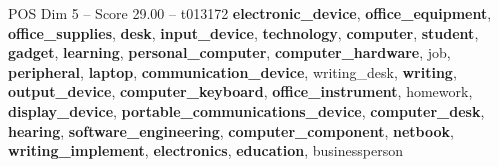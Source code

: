 \begin{textsample}{POS Dim 5 – Score 29.00 – t013172}  \label{ex:f5_pos_023}
\textbf{electronic\_device}, \textbf{office\_equipment}, \textbf{office\_supplies}, \textbf{desk}, \textbf{input\_device}, \textbf{technology}, \textbf{computer}, \textbf{student}, \textbf{gadget}, \textbf{learning}, \textbf{personal\_computer}, \textbf{computer\_hardware}, job, \textbf{peripheral}, \textbf{laptop}, \textbf{communication\_device}, writing\_desk, \textbf{writing}, \textbf{output\_device}, \textbf{computer\_keyboard}, \textbf{office\_instrument}, homework, \textbf{display\_device}, \textbf{portable\_communications\_device}, \textbf{computer\_desk}, \textbf{hearing}, \textbf{software\_engineering}, \textbf{computer\_component}, \textbf{netbook}, \textbf{writing\_implement}, \textbf{electronics}, \textbf{education}, businessperson

\end{textsample}
